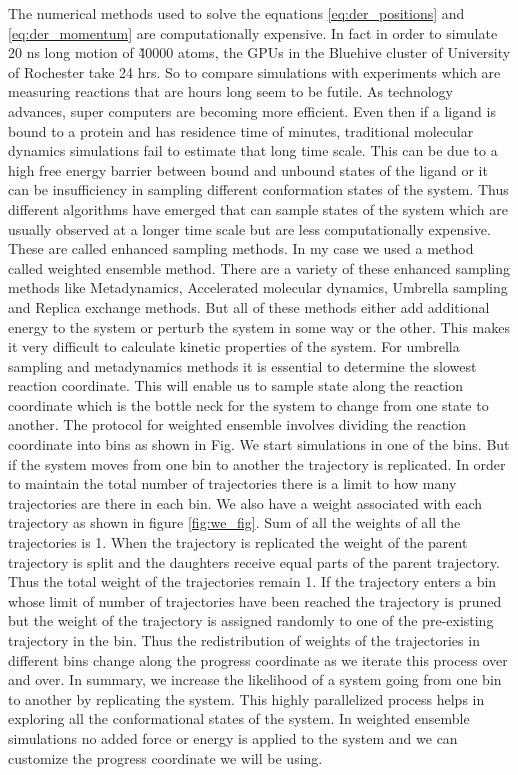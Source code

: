 The numerical methods used to solve the equations \ref{eq:der_positions} and 
\ref{eq:der_momentum} are computationally expensive. In fact in order to 
simulate 20 ns long motion of \~ 40000 atoms, the GPUs in the Bluehive cluster of
University of Rochester take 24 hrs. So to compare simulations
with experiments which are measuring reactions that are hours long seem to be futile.
As technology advances, super computers are becoming more efficient. Even then if a 
ligand is bound to a protein and has residence time of minutes, traditional molecular dynamics simulations fail to estimate that long time scale.
This can be due to a high free energy barrier between bound and unbound states of the ligand or it can be insufficiency in sampling different conformation states of the
system.
Thus different algorithms have emerged that can sample states of the system which 
are usually observed at a longer time scale but are less computationally expensive.
These are called enhanced sampling methods.
In my case we used a method called weighted ensemble method. There are a variety of these enhanced sampling methods like Metadynamics, Accelerated molecular dynamics, 
Umbrella sampling and Replica exchange methods. %
But all of these methods either add additional energy to the system or 
perturb the system in some way or the other. This makes it very difficult to calculate 
kinetic properties of the system. For umbrella sampling and metadynamics methods it is 
essential to determine the slowest reaction coordinate.
This will enable us to sample state along the reaction coordinate which is the bottle neck
for the system to change from one state to another.
The protocol for weighted ensemble involves dividing the reaction coordinate into bins
as shown in Fig. %
We start simulations in one of the bins. But if the system moves from one bin to another 
the trajectory is replicated. In order to maintain the total number of trajectories there is a limit to how many trajectories are there in each bin.
We also have a weight associated with each trajectory as shown in figure \ref{fig:we_fig}.%
Sum of all the weights of all the trajectories is 1.
When the trajectory is replicated the weight of the parent trajectory is split and the daughters receive 
equal parts of the parent trajectory. Thus the total weight of the trajectories 
remain 1.
If the trajectory enters a bin whose limit of number of trajectories have been reached
the trajectory is pruned but the weight of the trajectory is assigned randomly to one of the pre-existing 
trajectory in the bin.
Thus the redistribution of weights of the trajectories in different bins change 
along the progress coordinate as we iterate this process over and over.
In summary, we increase the likelihood of a system going from one bin to another by replicating the system.
This highly parallelized process helps in exploring all the conformational states of the system.
In weighted ensemble simulations no added force or energy is applied to the system
and we can customize the progress coordinate we will be using. %

